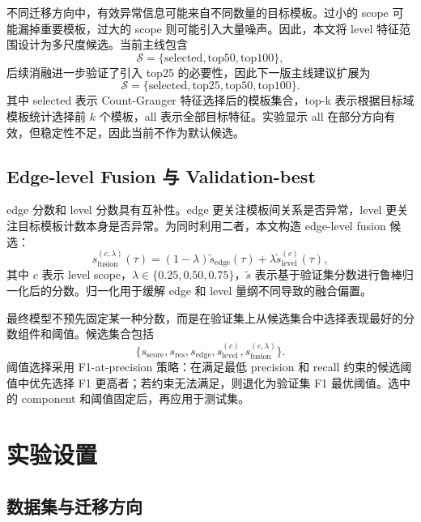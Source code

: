 \documentclass[UTF8,a4paper,zihao=-4]{ctexart}
\begin{document}
不同迁移方向中，有效异常信息可能来自不同数量的目标模板。过小的 scope 可能漏掉重要模板，过大的 scope 则可能引入大量噪声。因此，本文将 level 特征范围设计为多尺度候选。当前主线包含
\begin{equation}
  \mathcal{S}=\{\text{selected},\text{top50},\text{top100}\},
\end{equation}
后续消融进一步验证了引入 top25 的必要性，因此下一版主线建议扩展为
\begin{equation}
  \mathcal{S}=\{\text{selected},\text{top25},\text{top50},\text{top100}\}.
\end{equation}
其中 selected 表示 Count-Granger 特征选择后的模板集合，top-k 表示根据目标域模板统计选择前 $k$ 个模板，all 表示全部目标特征。实验显示 all 在部分方向有效，但稳定性不足，因此当前不作为默认候选。

\subsection{Edge-level Fusion 与 Validation-best}

edge 分数和 level 分数具有互补性。edge 更关注模板间关系是否异常，level 更关注目标模板计数本身是否异常。为同时利用二者，本文构造 edge-level fusion 候选：
\begin{equation}
  s_{\mathrm{fusion}}^{(c,\lambda)}(\tau)=
  (1-\lambda)\tilde{s}_{\mathrm{edge}}(\tau)+\lambda\tilde{s}_{\mathrm{level}}^{(c)}(\tau),
\end{equation}
其中 $c$ 表示 level scope，$\lambda\in\{0.25,0.50,0.75\}$，$\tilde{s}$ 表示基于验证集分数进行鲁棒归一化后的分数。归一化用于缓解 edge 和 level 量纲不同导致的融合偏置。

最终模型不预先固定某一种分数，而是在验证集上从候选集合中选择表现最好的分数组件和阈值。候选集合包括
\begin{equation}
\{s_{\mathrm{score}},s_{\mathrm{res}},s_{\mathrm{edge}},s_{\mathrm{level}}^{(c)},s_{\mathrm{fusion}}^{(c,\lambda)}\}.
\end{equation}
阈值选择采用 F1-at-precision 策略：在满足最低 precision 和 recall 约束的候选阈值中优先选择 F1 更高者；若约束无法满足，则退化为验证集 F1 最优阈值。选中的 component 和阈值固定后，再应用于测试集。

\section{实验设置}

\subsection{数据集与迁移方向}
\end{document}
